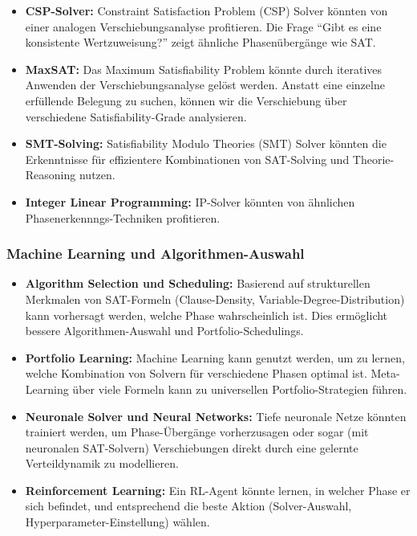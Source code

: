 ﻿\documentclass[a4paper,12pt]{article}
\theoremstyle{definition}
\begin{document}
\begin{itemize}
	\item \textbf{CSP-Solver:} Constraint Satisfaction Problem (CSP) Solver könnten von einer analogen Verschiebungsanalyse profitieren. Die Frage ``Gibt es eine konsistente Wertzuweisung?'' zeigt ähnliche Phasenübergänge wie SAT.
	
	\item \textbf{MaxSAT:} Das Maximum Satisfiability Problem könnte durch iteratives Anwenden der Verschiebungsanalyse gelöst werden. Anstatt eine einzelne erfüllende Belegung zu suchen, können wir die Verschiebung über verschiedene Satisfiability-Grade analysieren.
	
	\item \textbf{SMT-Solving:} Satisfiability Modulo Theories (SMT) Solver könnten die Erkenntnisse für effizientere Kombinationen von SAT-Solving und Theorie-Reasoning nutzen.
	
	\item \textbf{Integer Linear Programming:} IP-Solver könnten von ähnlichen Phasenerkennngs-Techniken profitieren.
\end{itemize}

\subsubsection{Machine Learning und Algorithmen-Auswahl}

\begin{itemize}
	\item \textbf{Algorithm Selection und Scheduling:} Basierend auf strukturellen Merkmalen von SAT-Formeln (Clause-Density, Variable-Degree-Distribution) kann vorhersagt werden, welche Phase wahrscheinlich ist. Dies ermöglicht bessere Algorithmen-Auswahl und Portfolio-Schedulings.
	
	\item \textbf{Portfolio Learning:} Machine Learning kann genutzt werden, um zu lernen, welche Kombination von Solvern für verschiedene Phasen optimal ist. Meta-Learning über viele Formeln kann zu universellen Portfolio-Strategien führen.
	
	\item \textbf{Neuronale Solver und Neural Networks:} Tiefe neuronale Netze könnten trainiert werden, um Phase-Übergänge vorherzusagen oder sogar (mit neuronalen SAT-Solvern) Verschiebungen direkt durch eine gelernte Verteildynamik zu modellieren.
	
	\item \textbf{Reinforcement Learning:} Ein RL-Agent könnte lernen, in welcher Phase er sich befindet, und entsprechend die beste Aktion (Solver-Auswahl, Hyperparameter-Einstellung) wählen.
\end{itemize}
\end{document}
